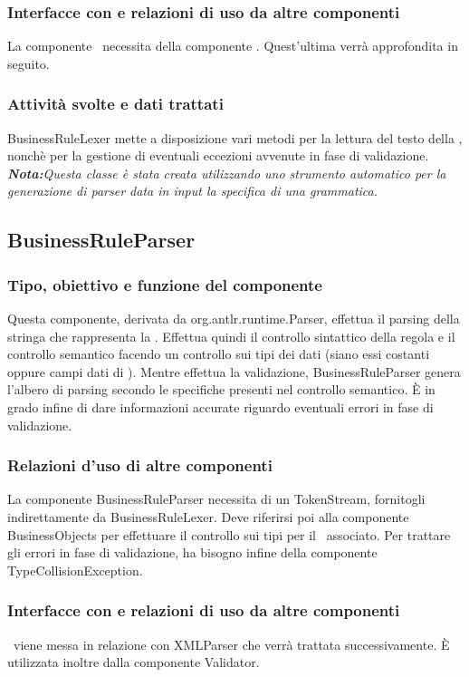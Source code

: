 \subsubsection{Interfacce con e relazioni di uso da altre componenti}
La componente \brp\ necessita della componente \brl. Quest'ultima verr\`a approfondita in seguito.
\subsubsection{Attivit\`a svolte e dati trattati}
BusinessRuleLexer mette a disposizione vari metodi per la lettura del testo della \br, nonch\`e per la gestione di eventuali eccezioni avvenute in fase di validazione.\\
\textit{\textbf{Nota:}Questa classe \`e stata creata utilizzando uno strumento automatico per la generazione di parser data in input la specifica di una grammatica.}

\subsection{BusinessRuleParser}
\subsubsection{Tipo, obiettivo e funzione del componente}
Questa componente, derivata da org.antlr.runtime.Parser, effettua il parsing della stringa che rappresenta la \br. Effettua quindi il controllo sintattico della regola e il controllo semantico facendo un controllo sui tipi dei dati (siano essi costanti oppure campi dati di \bos). Mentre effettua la validazione, BusinessRuleParser genera l'albero di parsing secondo le specifiche presenti nel controllo semantico. \`E in grado infine di dare informazioni accurate riguardo eventuali errori in fase di validazione.
\subsubsection{Relazioni d'uso di altre componenti}
La componente BusinessRuleParser necessita di un TokenStream, fornitogli indirettamente da BusinessRuleLexer. Deve riferirsi poi alla componente BusinessObjects per effettuare il controllo sui tipi per il \bo\ associato. Per trattare gli errori in fase di validazione, ha bisogno infine della componente TypeCollisionException.
\subsubsection{Interfacce con e relazioni di uso da altre componenti}
\brp\ viene messa in relazione con XMLParser che verr\`a trattata successivamente.
\`E utilizzata inoltre dalla componente Validator.
